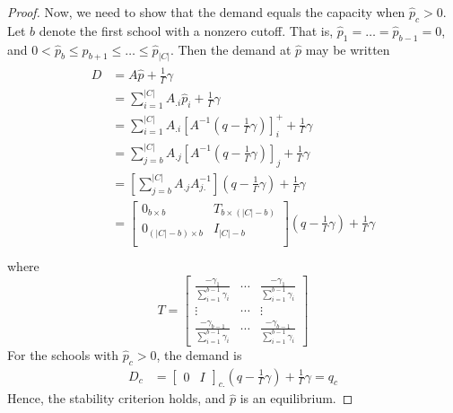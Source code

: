 \documentclass[12pt]{article}
\theoremstyle{definition}
\begin{document}
\begin{proof}
Now, we need to show that the demand equals the capacity when $\hat p_c > 0$. Let $b$ denote the first school with a nonzero cutoff. That is, $\hat p_1 = \dots = \hat p_{b-1} = 0$, and $0 < \hat p_b \leq p_{b+1} \leq \dots \leq \hat p_{|C|}$. Then the demand at $\hat p$ may be written
\begin{gather}\begin{aligned} \label{demandatphat}
D &= A \hat p + \frac{1}{\Gamma}\gamma \\
&= \sum_{i=1}^{|C|} A_{.i} \hat p_i + \frac{1}{\Gamma}\gamma  \\
&= \sum_{i=1}^{|C|} A_{.i} \left[A^{-1} \left(q - \frac{1}{\Gamma}\gamma\right) \right]_i^+ + \frac{1}{\Gamma}\gamma  \\
&= \sum_{j=b}^{|C|} A_{.j} \left[A^{-1} \left(q - \frac{1}{\Gamma}\gamma\right) \right]_j + \frac{1}{\Gamma}\gamma  \\
&= \left[\sum_{j=b}^{|C|} A_{.j} A_{j.}^{-1} \right] \left(q - \frac{1}{\Gamma}\gamma\right) + \frac{1}{\Gamma}\gamma  \\
&= \begin{bmatrix}
0_{b \times b} & T_{b \times (|C| - b)} \\
0_{(|C| - b) \times b} & I_{|C| - b} \\
\end{bmatrix} \left(q - \frac{1}{\Gamma}\gamma\right) + \frac{1}{\Gamma}\gamma  \\
\end{aligned}\end{gather}
where
\begin{equation} \label{Tdef}
T = \begin{bmatrix}
\frac{-\gamma_1}{\sum_{i=1}^{b-1} \gamma_i} & \cdots & \frac{-\gamma_1}{\sum_{i=1}^{b-1} \gamma_i} \\
\vdots & \cdots & \vdots \\
\frac{-\gamma_{b-1}}{\sum_{i=1}^{b-1} \gamma_i} & \cdots & \frac{-\gamma_{b-1}}{\sum_{i=1}^{b-1} \gamma_i}
\end{bmatrix}\end{equation}
For the schools with $\hat p_c > 0$, the demand is
\begin{align} \label{demand-pc-gt-zero}
D_c &=
\begin{bmatrix}
0& I
\end{bmatrix}_{c.} \left(q - \frac{1}{\Gamma}\gamma\right) + \frac{1}{\Gamma}\gamma
= q_c
\end{align}
Hence, the stability criterion holds, and $\hat p$ is an equilibrium.
\end{proof}
\end{document}
